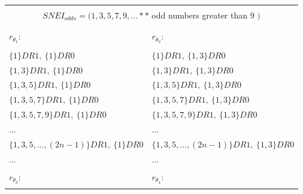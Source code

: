 	\newpage
	\begin{table}[h!]
		\begin{center}
			\begin{tabular}{|l||l|}
				\hline
					\multicolumn{2}{|c|}{\cellcolor{bosunired}  } \\
					\multicolumn{2}{|c|}{\cellcolor{bosunired} {\huge $SNEI_{odds} = (1, 3, 5, 7, 9, ...**$} odd numbers greater than 9    {\huge $)$}  }\\
					\multicolumn{2}{|c|}{\cellcolor{bosunired}  } \\
				\hline
				\hline
					\cellcolor{bosunired!50} & \cellcolor{bosunired!50}  \\
					\cellcolor{bosunired!50} {\LARGE $r_{\theta_{1}}$:  } & \cellcolor{bosunired!50} {\LARGE $r_{\theta_{2}}$:  } \\
					\cellcolor{bosunired!50} & \cellcolor{bosunired!50}  \\
				\hline
				\hline
					$\{1\}DR1,\:\{1\}DR0$ &
					$\{1\}DR1,\:\{1, 3\}DR0$ \\
					$\{1, 3\}DR1,\:\{1\}DR0$ &
					$\{1, 3\}DR1,\:\{1, 3\}DR0$ \\
					$\{1, 3, 5\}DR1,\:\{1\}DR0$ &
					$\{1, 3, 5\}DR1,\:\{1, 3\}DR0$ \\
					$\{1, 3, 5, 7\}DR1,\:\{1\}DR0$ &
					$\{1, 3, 5, 7\}DR1,\:\{1, 3\}DR0$ \\
					$\{1, 3, 5, 7, 9\}DR1,\:\{1\}DR0$ &
					$\{1, 3, 5, 7, 9\}DR1,\:\{1, 3\}DR0$ \\
					... & ... \\
					$\{1, 3, 5, ... , (2n-1)\}DR1,\:\{1\}DR0$ &
					$\{1, 3, 5, ... , (2n-1)\}DR1,\:\{1, 3\}DR0$ \\				
					... & ... \\						
				\hline
				\hline
					\cellcolor{bosunired!50} & \cellcolor{bosunired!50}  \\
					\cellcolor{bosunired!50} {\LARGE $r_{\theta_{3}}$:  } & \cellcolor{bosunired!50} {\LARGE $r_{\theta_{4}}$:  } \\
					\cellcolor{bosunired!50} & \cellcolor{bosunired!50}  \\

\end{tabular}
\end{center}
\end{table}
